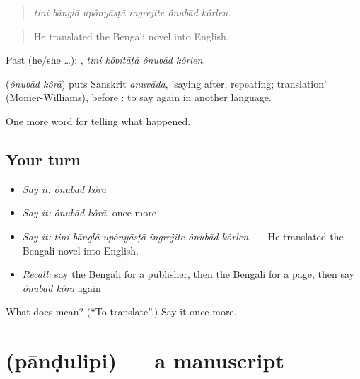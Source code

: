 \begin{quote}
     
\end{quote}

\begin{quote}
\emph{tini bānglā upônyāsṭā ingrejite ônubād kôrlen.}
\end{quote}

\begin{quote}
He translated the Bengali novel into English.
\end{quote}

Past (he/she …):    , \emph{tini kôbitāṭā ônubād kôrlen}.

\begin{cousinweb}
\textbf{ } (\emph{ônubād kôrā}) puts Sanskrit \emph{anuvāda}, 'saying after, repeating; translation' (Monier-Williams), before : to say again in another language.
\end{cousinweb}

\begin{grammarlens}[title={What you've built}]
One more word for telling what happened.
\end{grammarlens}

\subsection*{Your turn}
\begin{itemize}
\raggedright
  \item \emph{Say it:} \emph{ônubād kôrā}
  \item \emph{Say it:} \emph{ônubād kôrā}, once more
  \item \emph{Say it:} \emph{tini bānglā upônyāsṭā ingrejite ônubād kôrlen.} — He translated the Bengali novel into English.
  \item \emph{Recall:} say the Bengali for a publisher, then the Bengali for a page, then say \emph{ônubād kôrā} again
\end{itemize}

\begin{tcolorbox}[breakable,colback=teal!4,colframe=teal!35!black,title={Before you move on}]
What does   mean? (\textquotedblleft{}To translate\textquotedblright{}.) Say it once more.
\end{tcolorbox}
\section[\texorpdfstring{\bn{পাণ্ডুলিপি} (pānḍulipi)}{পাণ্ডুলিপি (pānḍulipi)}]{ (pānḍulipi) — a manuscript}

